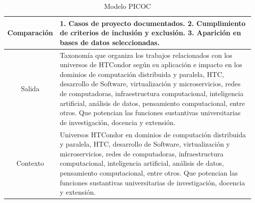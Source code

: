 \begin{table}[H]
\begin{tabular}{|c|p{12cm}|}
		Comparación         &
		\textbf{1.} Casos de proyecto documentados.
		\textbf{2.} Cumplimiento de criterios de inclusión y exclusión.
		\textbf{3.} Aparición en bases de datos seleccionadas.                                                                                                                                                                                                                                                                                                                                                                                                                                                                 \\ \hline
		Salida              & Taxonomía que organiza los trabajos relacionados con los universos de HTCondor según su aplicación e impacto en los dominios de computación distribuida y paralela, HTC, desarrollo de Software, virtualización y microservicios, redes de computadoras, infraestructura computacional, inteligencia artificial, análisis de datos, pensamiento computacional, entre otros. Que potencian las funciones sustantivas universitarias de investigación, docencia y extensión.                       \\ \hline
		Contexto            & Universos HTCondor en dominios de computación distribuida y paralela, HTC, desarrollo de Software, virtualización y microservicios, redes de computadoras, infraestructura computacional, inteligencia artificial, análisis de datos, pensamiento computacional, entre otros. Que potencian las funciones sustantivas universitarias de investigación, docencia y extensión.                                                                                                                     \\ \hline
	\end{tabular}
	\caption{Modelo PICOC}
	\label{table:modelo-picoc}
\end{table}



